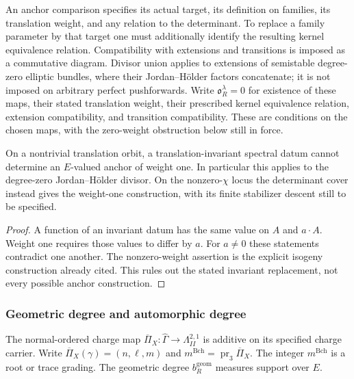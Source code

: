 \begin{definition}
\label{def:finite-anchor-residual}
An anchor comparison specifies its actual target, its definition
on families, its translation weight, and any relation to the
determinant. To replace a family parameter by that target one
must additionally identify the resulting kernel equivalence
relation. Compatibility with extensions and transitions is imposed
as a commutative diagram. Divisor union applies to extensions of
semistable degree-zero elliptic bundles, where their
Jordan--H\"older factors concatenate; it is not imposed on arbitrary
perfect pushforwards.
Write $\mathfrak o^\lambda_R=0$ for existence of these maps,
their stated translation weight, their prescribed kernel
equivalence relation, extension compatibility, and transition
compatibility. These are conditions on the chosen maps, with
the zero-weight obstruction below still in force.
\end{definition}

\begin{proposition}
\label{prop:first-window-anchor-residual-vanishing-criterion}
On a nontrivial translation orbit, a translation-invariant
spectral datum cannot determine an $E$-valued anchor of weight
one. In particular this applies to the degree-zero
Jordan--H\"older divisor. On the nonzero-$\chi$ locus the
determinant cover instead gives the weight-one construction,
with its finite stabilizer descent still to be specified.
\end{proposition}

\begin{proof}
A function of an invariant datum has the same value on $A$ and
$a\cdot A$. Weight one requires those values to differ by $a$.
For $a\ne0$ these statements contradict one another. The
nonzero-weight assertion is the explicit isogeny construction
already cited. This rules out the stated invariant replacement,
not every possible anchor construction.
\end{proof}

\subsubsection*{Geometric degree and automorphic degree}

The normal-ordered charge map
$\overline\Pi_X:\widehat\Gamma\to\Lambda_{II}^{2,1}$ is additive on
its specified charge carrier. Write
$\overline\Pi_X(\gamma)=(n,\ell,m)$ and
$m^{\mathrm{Bch}}=\operatorname{pr}_3\overline\Pi_X$.
The integer $m^{\mathrm{Bch}}$ is a root or trace grading. The
geometric degree $b_R^{\mathrm{geom}}$ measures support over $E$.

